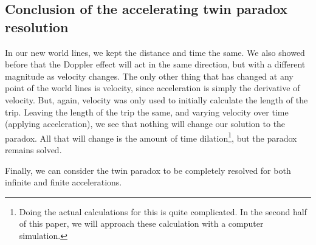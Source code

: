 	\subsection{Conclusion of the accelerating twin paradox resolution}
		In our new world lines, we kept the distance and time the same.
		We also showed before that the Doppler effect will act in the same direction, but with a different magnitude as velocity changes.
		The only other thing that has changed at any point of the world lines is velocity, since acceleration is simply the derivative of velocity.
		But, again, velocity was only used to initially calculate the length of the trip.
		Leaving the length of the trip the same, and varying velocity over time (applying acceleration), we see that nothing will change our solution to the paradox. All that will change is the amount of time dilation\footnote{Doing the actual calculations for this is quite complicated. In the second half of this paper, we will approach these calculation with a computer simulation.}, but the paradox remains solved.

		Finally, we can consider the twin paradox to be completely resolved for both infinite and finite accelerations.
